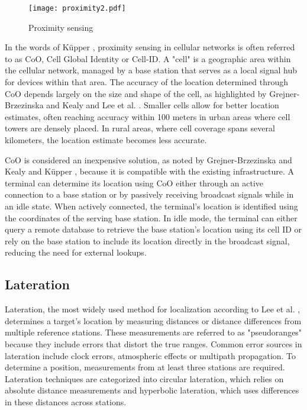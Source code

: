 \begin{figure}[htbp]
    \centering
    \texttt{[image: proximity2.pdf]}
    \caption{Proximity sensing \cite{militaru2024positioning}}
    \label{fig:proximity2}
\end{figure}

In the words of K\"upper \cite{kupper2005location}, proximity sensing in cellular networks is often referred to as \ac{CoO}, Cell Global Identity or Cell-ID. 
A "cell" is a geographic area within the cellular network, managed by a base station that serves as a local signal hub for devices within that area. 
The accuracy of the location determined through \acs{CoO} depends largely on the size and shape of the cell, as highlighted by Grejner-Brzezinska and Kealy \cite{grejner2004positioning} and Lee et al. \cite{lee2014localization}.
Smaller cells allow for better location estimates, often reaching accuracy within 100 meters in urban areas where cell towers are densely placed.
In rural areas, where cell coverage spans several kilometers, the location estimate becomes less accurate.

\acs{CoO} is considered an inexpensive solution, as noted by Grejner-Brzezinska and Kealy \cite{grejner2004positioning} and K\"upper \cite{kupper2005location}, because it is compatible with the existing infrastructure. 
A terminal can determine its location using \acs{CoO} either through an active connection to a base station or by passively receiving broadcast signals while in an idle state. 
When actively connected, the terminal's location is identified using the coordinates of the serving base station. 
In idle mode, the terminal can either query a remote database to retrieve the base station's location using its cell ID or rely on the base station to include its location directly in the broadcast signal, reducing the need for external lookups. 

\subsection{Lateration}
Lateration, the most widely used method for localization according to Lee et al. \cite{lee2014localization}, determines a target's location by measuring distances or distance differences from multiple reference stations. 
These measurements are referred to as "pseudoranges" because they include errors that distort the true ranges. 
Common error sources in lateration include clock errors, atmospheric effects or multipath propagation.
To determine a position, measurements from at least three stations are required.
Lateration techniques are categorized into circular lateration, which relies on absolute distance measurements and hyperbolic lateration, which uses differences in these distances across stations.

